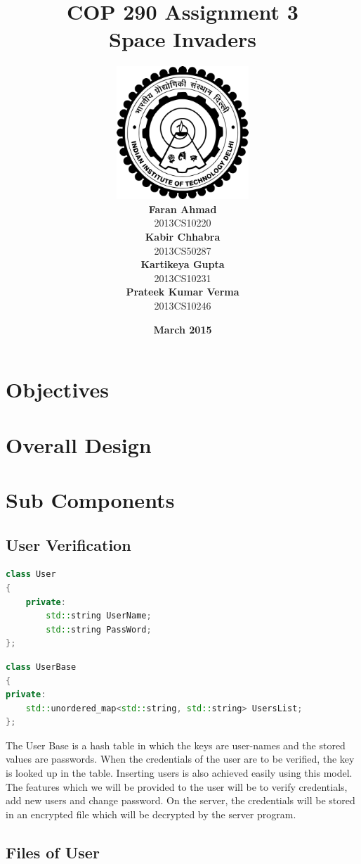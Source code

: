 \documentclass{article}
\title{\vspace*{\fill} \textbf{COP 290 Assignment 3}
	  \\ {\Large \textbf{Space Invaders}}
}
\author{
	\vspace{5mm} \includegraphics[width=5cm]{logo.png} \\
	 \textbf{Faran Ahmad}\\
	2013CS10220 \vspace{2mm} \\
	\textbf{Kabir Chhabra}\\ 
	2013CS50287 \vspace{2mm} \\
	\textbf{Kartikeya Gupta}\\ 
	2013CS10231 \vspace{2mm} \\
	\textbf{Prateek Kumar Verma}\\ 
	2013CS10246
}
\date{\vspace{3mm} \textbf{March 2015} \vspace*{\fill}}
\begin{document}
	\maketitle

	\newpage

	\tableofcontents

	\newpage

	\section{Objectives}
	\section{Overall Design}
		\begin{enumerate}
		\end{enumerate}

	\section{Sub Components}

			\subsection{User Verification}
			\begin{lstlisting}[language=C++, caption={Class Parameters for User}]
class User
{
	private:
		std::string UserName;
		std::string PassWord;	
};
			\end{lstlisting}
			\begin{lstlisting}[language=C++, caption={Class Parameters for UserBase}]
class UserBase
{
private:
	std::unordered_map<std::string, std::string> UsersList;
};
			\end{lstlisting}
			The User Base is a hash table in which the keys are user-names and the stored values are passwords. When the credentials of the user are to be verified, the key is looked up in the table. Inserting users is also achieved easily using this model. The features which we will be provided to the user will be to verify credentials, add new users and change password. On the server, the credentials will be stored in an encrypted file which will be decrypted by the server program.

			\subsection{Files of User}
\end{document}
